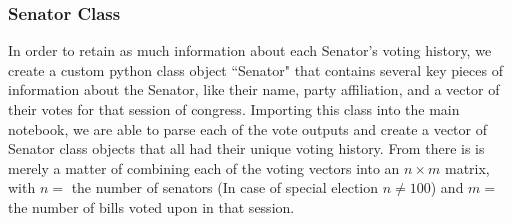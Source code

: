 \documentclass[letterpaper,12pt]{article}
\begin{document}
\subsubsection{Senator Class}
In order to retain as much information about each Senator's voting history, we create a custom python class object ``Senator" that contains several key pieces of information about the Senator, like their name, party affiliation, and a vector of their votes for that session of congress. Importing this class into the main notebook, we are able to parse each of the vote outputs and create a vector of Senator class objects that all had their unique voting history. From there is is merely a matter of combining each of the voting vectors into an $n\times m$ matrix, with $n=$ the number of senators (In case of special election $n\neq 100$) and $m=$ the number of bills voted upon in that session.
\end{document}
